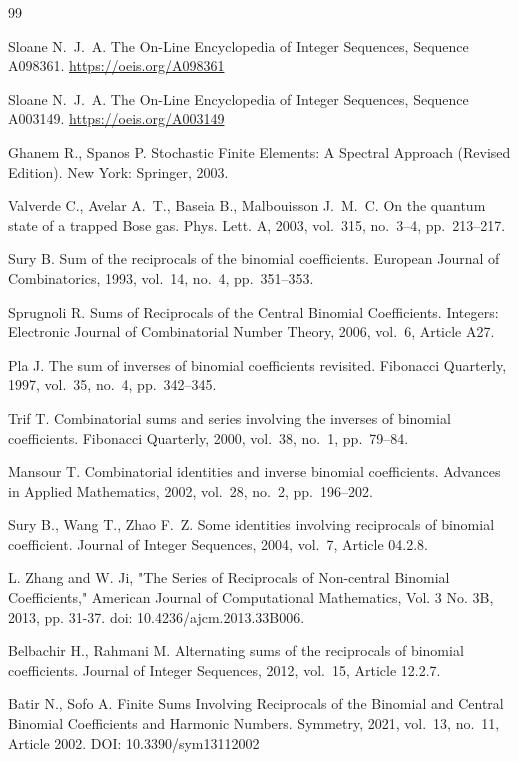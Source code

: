 \documentclass[12pt]{article}
\begin{document}
\begin{thebibliography}{99}

Sloane N.~J.~A.
The On-Line Encyclopedia of Integer Sequences,
Sequence A098361.
\url{https://oeis.org/A098361}

Sloane N.~J.~A.
The On-Line Encyclopedia of Integer Sequences,
Sequence A003149.
\url{https://oeis.org/A003149}

Ghanem R., Spanos P.
Stochastic Finite Elements: A Spectral Approach (Revised Edition).
New York: Springer, 2003.

Valverde C., Avelar A.~T., Baseia B., Malbouisson J.~M.~C.
On the quantum state of a trapped Bose gas.
Phys. Lett. A, 2003, vol.~315, no.~3--4, pp.~213--217.

Sury B.
Sum of the reciprocals of the binomial coefficients.
European Journal of Combinatorics, 1993, vol.~14, no.~4, pp.~351--353.

Sprugnoli R.
Sums of Reciprocals of the Central Binomial Coefficients.
Integers: Electronic Journal of Combinatorial Number Theory,
2006, vol.~6, Article A27.

Pla J.
The sum of inverses of binomial coefficients revisited.
Fibonacci Quarterly, 1997, vol.~35, no.~4, pp.~342--345.

Trif T.
Combinatorial sums and series involving the inverses of binomial coefficients.
Fibonacci Quarterly, 2000, vol.~38, no.~1, pp.~79--84.

Mansour T.
Combinatorial identities and inverse binomial coefficients.
Advances in Applied Mathematics, 2002, vol.~28, no.~2, pp.~196--202.

Sury B., Wang T., Zhao F.~Z.
Some identities involving reciprocals of binomial coefficient.
Journal of Integer Sequences, 2004, vol.~7, Article 04.2.8.


 L. Zhang and W. Ji, "The Series of Reciprocals of Non-central Binomial Coefficients," American Journal of Computational Mathematics, Vol. 3 No. 3B, 2013, pp. 31-37. doi: 10.4236/ajcm.2013.33B006.

Belbachir H., Rahmani M.
Alternating sums of the reciprocals of binomial coefficients.
Journal of Integer Sequences, 2012, vol.~15, Article 12.2.7.

Batir N., Sofo A.
Finite Sums Involving Reciprocals of the Binomial and Central Binomial Coefficients and Harmonic Numbers.
Symmetry, 2021, vol.~13, no.~11, Article 2002.
DOI: 10.3390/sym13112002


\end{thebibliography}
\end{document}
